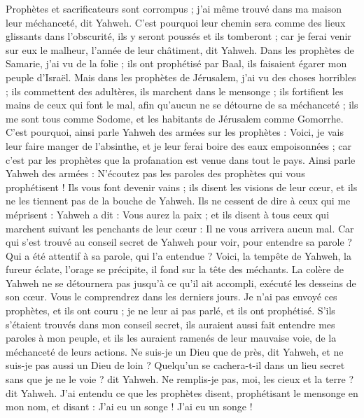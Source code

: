 \begin{multicols}{2}
Prophètes et sacrificateurs sont corrompus ; j'ai même trouvé dans ma maison leur méchanceté, dit Yahweh.
C'est pourquoi leur chemin sera comme des lieux glissants dans l'obscurité, ils y seront poussés et ils tomberont ; car je ferai venir sur eux le malheur, l'année de leur châtiment, dit Yahweh.
Dans les prophètes de Samarie, j'ai vu de la folie ; ils ont prophétisé par Baal, ils faisaient égarer mon peuple d'Israël.
Mais dans les prophètes de Jérusalem, j'ai vu des choses horribles ; ils commettent des adultères, ils marchent dans le mensonge ; ils fortifient les mains de ceux qui font le mal, afin qu'aucun ne se détourne de sa méchanceté ; ils me sont tous comme Sodome, et les habitants de Jérusalem comme Gomorrhe.
C'est pourquoi, ainsi parle Yahweh des armées sur les prophètes : Voici, je vais leur faire manger de l'absinthe, et je leur ferai boire des eaux empoisonnées ; car c'est par les prophètes que la profanation est venue dans tout le pays.
Ainsi parle Yahweh des armées : N'écoutez pas les paroles des prophètes qui vous prophétisent ! Ils vous font devenir vains ; ils disent les visions de leur cœur, et ils ne les tiennent pas de la bouche de Yahweh.
Ils ne cessent de dire à ceux qui me méprisent : Yahweh a dit : Vous aurez la paix ; et ils disent à tous ceux qui marchent suivant les penchants de leur cœur : Il ne vous arrivera aucun mal.
Car qui s'est trouvé au conseil secret de Yahweh pour voir, pour entendre sa parole ? Qui a été attentif à sa parole, qui l'a entendue ?
Voici, la tempête de Yahweh, la fureur éclate, l'orage se précipite, il fond sur la tête des méchants.
La colère de Yahweh ne se détournera pas jusqu'à ce qu'il ait accompli, exécuté les desseins de son cœur. Vous le comprendrez dans les derniers jours.
Je n'ai pas envoyé ces prophètes, et ils ont couru ; je ne leur ai pas parlé, et ils ont prophétisé.
S'ils s'étaient trouvés dans mon conseil secret, ils auraient aussi fait entendre mes paroles à mon peuple, et ils les auraient ramenés de leur mauvaise voie, de la méchanceté de leurs actions.
Ne suis-je un Dieu que de près, dit Yahweh, et ne suis-je pas aussi un Dieu de loin ?
Quelqu'un se cachera-t-il dans un lieu secret sans que je ne le voie ? dit Yahweh. Ne remplis-je pas, moi, les cieux et la terre ? dit Yahweh.
J'ai entendu ce que les prophètes disent, prophétisant le mensonge en mon nom, et disant : J'ai eu un songe ! J'ai eu un songe !

\end{multicols}

